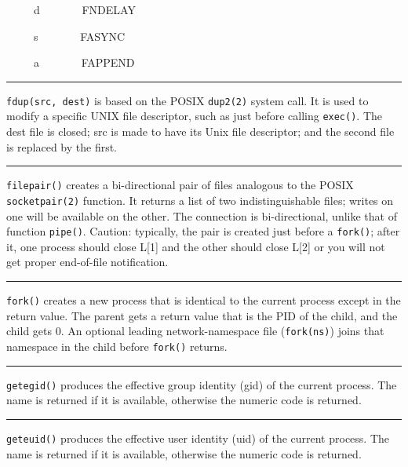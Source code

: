 \ \ \ \ \ d \ \ \ \ \ \ \ FNDELAY 

\ \ \ \ \ s \ \ \ \ \ \ \ FASYNC 

\ \ \ \ \ a \ \ \ \ \ \ \ FAPPEND 

\bigskip\hrule\vspace{0.1cm}

\noindent
\texttt{fdup(src, dest)} is based on the POSIX \texttt{dup2(2)} system
call. It is used to
modify a specific UNIX file descriptor, such as just before calling
\texttt{exec()}. The dest file is closed; src is made to have its Unix file
descriptor; and the second file is replaced by the first. 

\bigskip\hrule\vspace{0.1cm}

\noindent
\texttt{filepair()} creates a bi-directional pair of files
analogous to the POSIX \texttt{socketpair(2)} function. It returns a list of two
indistinguishable files; writes on one will be available on the other. The
connection is bi-directional, unlike that of function \texttt{pipe()}.
Caution: typically, the pair is
created just before a \texttt{fork()}; after it, one process should close L[1]
and the other should close L[2] or you will not get proper end-of-file
notification. 

\bigskip\hrule\vspace{0.1cm}

\noindent
\texttt{fork()} creates a new process that is identical to the current process
except in the return value. The parent gets a return value that is the
PID of the child, and the child gets 0. An optional leading
network-namespace file (\texttt{fork(ns)}) joins that namespace in the
child before \texttt{fork()} returns.

\bigskip\hrule\vspace{0.1cm}

\noindent
\texttt{getegid()} produces the effective group identity (gid) of the current
process. The name is returned if it is available, otherwise the numeric
code is returned.

\bigskip\hrule\vspace{0.1cm}

\noindent
\texttt{geteuid()} produces the effective user identity (uid) of the current
process. The name is returned if it is available, otherwise the numeric
code is returned.

